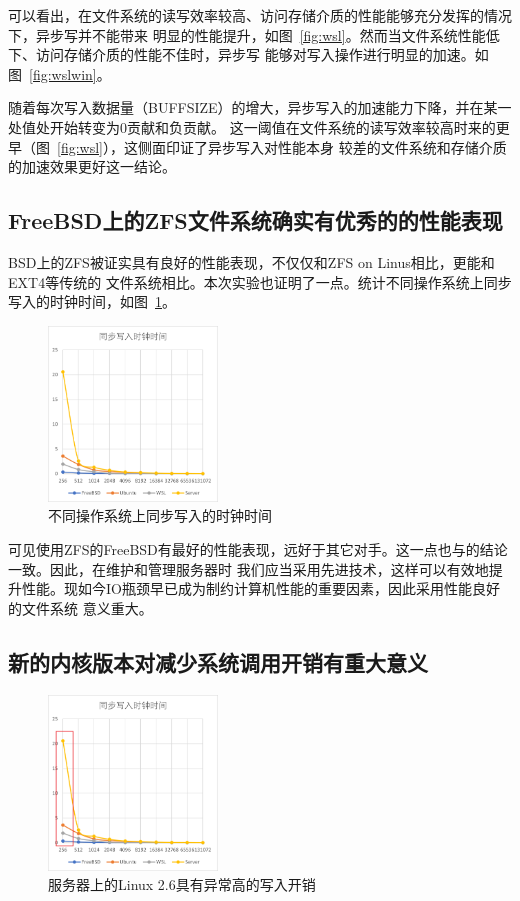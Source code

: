 \documentclass[a4paper,twoside]{article}
\begin{document}
\begin{spacing}{1.2}
可以看出，在文件系统的读写效率较高、访问存储介质的性能能够充分发挥的情况下，异步写并不能带来
明显的性能提升，如图~\ref{fig:wsl}。然而当文件系统性能低下、访问存储介质的性能不佳时，异步写
能够对写入操作进行明显的加速。如图~\ref{fig:wslwin}。

随着每次写入数据量（BUFFSIZE）的增大，异步写入的加速能力下降，并在某一处值处开始转变为0贡献和负贡献。
这一阈值在文件系统的读写效率较高时来的更早（图~\ref{fig:wsl}），这侧面印证了异步写入对性能本身
较差的文件系统和存储介质的加速效果更好这一结论。

\subsection{FreeBSD上的ZFS文件系统确实有优秀的的性能表现}

BSD上的ZFS\cite{rodeh2003zfs}被证实具有良好的性能表现，不仅仅和ZFS on Linus相比，更能和EXT4等传统的
文件系统相比\cite{freebsdzfs}。本次实验也证明了一点。统计不同操作系统上同步写入的时钟时间，如图~\ref{fig:allsync}。

\begin{figure}[htb]
	\centering
	\caption{不同操作系统上同步写入的时钟时间}
	\label{fig:allsync}
	\includegraphics[width=0.4\textwidth]{clock.png}
\end{figure}

可见使用ZFS的FreeBSD有最好的性能表现，远好于其它对手。这一点也与\cite{freebsdzfs}的结论一致。因此，在维护和管理服务器时
我们应当采用先进技术，这样可以有效地提升性能。现如今IO瓶颈早已成为制约计算机性能的重要因素，因此采用性能良好的文件系统
意义重大。

\subsection{新的内核版本对减少系统调用开销有重大意义}

\begin{figure}[htb]
	\centering
	\caption{服务器上的Linux 2.6具有异常高的写入开销}
	\label{fig:highsync}
	\includegraphics[width=0.4\textwidth]{clock_high.png}
\end{figure}


\end{spacing}
\end{document}
